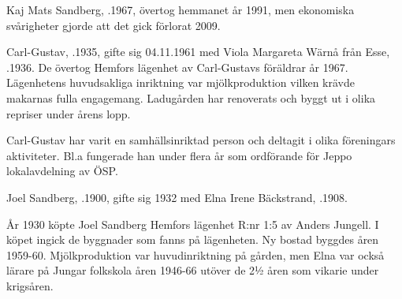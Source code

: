 %
Kaj Mats Sandberg,  .1967, övertog hemmanet år 1991, men ekonomiska svårigheter gjorde att det gick förlorat 2009.\jhvspace{}


%
Carl-Gustav, .1935, gifte sig 04.11.1961 med Viola Margareta Wärnå från Esse, .1936. De övertog Hemfors lägenhet av Carl-Gustavs föräldrar år 1967. Lägenhetens huvudsakliga inriktning var mjölkproduktion vilken krävde makarnas fulla engagemang. Ladugården har renoverats och byggt ut i olika repriser under årens lopp.

Carl-Gustav har varit en samhällsinriktad person och deltagit i olika föreningars aktiviteter. Bl.a fungerade han under flera år som
ordförande för Jeppo lokalavdelning av ÖSP.
\begin{jhchildren}
  \item {}
  \item {}
  \item {}
  \item {}
\end{jhchildren}



%


%
Joel Sandberg, .1900, gifte sig 1932 med Elna Irene Bäckstrand, .1908.

År 1930 köpte Joel Sandberg Hemfors lägenhet R:nr 1:5 av Anders Jungell. I köpet ingick de byggnader som fanns på lägenheten. Ny bostad byggdes åren 1959-60. Mjölkproduktion var huvudinriktning på gården, men Elna var också lärare på Jungar folkskola åren 1946-66 utöver de 2½ åren som vikarie under krigsåren.
\begin{jhchildren}
  \item {}
  \item {}
  \item {}
  \item {}
\end{jhchildren}


